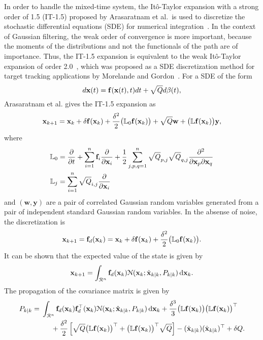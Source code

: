 \documentclass[../zhang_thesis.tex]{subfiles}
\begin{document}
In order to handle the mixed-time system, the It\^o-Taylor expansion with a strong order of 1.5 (IT-1.5) proposed by Arasaratnam et al.\ is used to discretize the stochastic differential equations (SDE) for numerical integration~\cite{arasaratnam10}. In the context of Gaussian filtering, the weak order of convergence is more important, because the moments of the distributions and not the functionals of the path are of importance. Thus, the IT-1.5 expansion is equivalent to the weak It\^o-Taylor expansion
of order 2.0~\cite{kloeden99}, which was proposed as a SDE discretization method for target tracking applications by Morelande and Gordon~\cite{morelande05}. For a SDE of the form
\begin{equation}
    d\mathbf{x}(t) = \mathbf{f}(\mathbf{x}(t),t)dt + \sqrt{Q} d\mathbf{\beta}(t),
\end{equation}
Arasaratnam et al. gives the IT-1.5 expansion as~\cite{arasaratnam10}
\begin{equation}
    \mathbf{x}_{k+1} = \mathbf{x}_k + \delta \mathbf{f}(\mathbf{x}_k) + \frac{\delta^2}{2} \big( \mathbb{L}_0 \mathbf{f}(\mathbf{x}_k) \big) + \sqrt{Q} \mathbf{w} + \big( \mathbb{L} \mathbf{f}(\mathbf{x}_k) \big) \mathbf{y},
\end{equation}
where
\begin{align}
    \mathbb{L}_0 & = \frac{\partial}{\partial t} + \sum_{i=1}^n \mathbf{f}_i \frac{\partial}{\partial \mathbf{x}_i} + \frac{1}{2} \sum_{j,p,q=1}^n \sqrt{Q}_{p,j} \sqrt{Q}_{q,j} \frac{\partial^2}{\partial \mathbf{x}_p \partial \mathbf{x}_q} \\
    \mathbb{L}_j & = \sum_{i=1}^n \sqrt{Q}_{i,j} \frac{\partial}{\partial \mathbf{x}_i}
\end{align}
and $(\mathbf{w},\mathbf{y})$ are a pair of correlated Gaussian random variables generated from a pair of independent standard Gaussian random variables. In the absense of noise, the discretization is
\begin{equation}
    \mathbf{x}_{k+1} = \mathbf{f}_d(\mathbf{x}_k) = \mathbf{x}_k + \delta \mathbf{f}(\mathbf{x}_k) + \frac{\delta^2}{2} \big( \mathbb{L}_0 \mathbf{f}(\mathbf{x}_k) \big).
\end{equation}
It can be shown that the expected value of the state is given by
\begin{equation}
    \mathbf{x}_{k+1} = \int_{\mathcal{R}^n} \mathbf{f}_d(\mathbf{x}_k) \mathcal{N}(\mathbf{x}_k;\hat{\mathbf{x}}_{k|k},P_{k|k})\,\mathrm{d}\mathbf{x}_k.
\end{equation}
The propagation of the covariance matrix is given by
\begin{align}
    P_{k|k} = \begin{multlined}[t] \int_{\mathcal{R}^n} \vf_d(\vx_k) \vf_d^\top(\vx_k) \mathcal{N}(\vx_k;\hat{\vx}_{k|k},P_{k|k})\,\mathrm{d}\vx_k + \frac{\delta^3}{3} \big( \mathbb{L}\vf(\vx_k) \big) \big( \mathbb{L}\vf(\vx_k) \big)^\top \\ 
    + \frac{\delta^2}{2} \left[ \sqrt{Q} \big(\mathbb{L}\vf(\vx_k)\big)^\top + \big(\mathbb{L}\vf(\vx_k)\big)^\top \sqrt{Q} \right] - (\hat{\vx}_{k|k})(\hat{\vx}_{k|k})^\top + \delta Q.
    \end{multlined}
\end{align}
\end{document}
